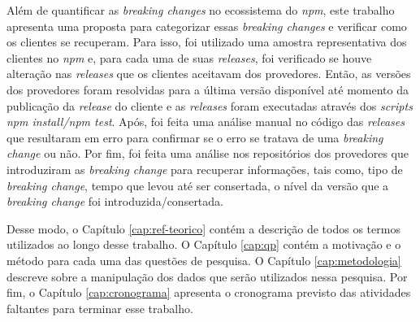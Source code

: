 Além de quantificar as \textit{breaking changes} no ecossistema do \textit{npm}, este trabalho apresenta uma proposta para categorizar essas \textit{breaking changes} e verificar como os clientes se recuperam. Para isso, foi utilizado uma amostra representativa dos clientes no \textit{npm} e, para cada uma de suas \textit{releases}, foi verificado se houve alteração nas \textit{releases} que os clientes aceitavam dos provedores. Então, as versões dos provedores foram resolvidas para a última versão disponível até momento da publicação da \textit{release} do cliente e as \textit{releases} foram executadas através dos \textit{scripts npm install/npm test}. Após, foi feita uma análise manual no código das \textit{releases} que resultaram em erro para confirmar se o erro se tratava de uma \textit{breaking change} ou não. Por fim, foi feita uma análise nos repositórios dos provedores que introduziram as \textit{breaking change} para recuperar informações, tais como, tipo de \textit{breaking change}, tempo que levou até ser consertada, o nível da versão que a \textit{breaking change} foi introduzida/consertada.

Desse modo, o Capítulo \ref{cap:ref-teorico} contém a descrição de todos os termos utilizados ao longo desse trabalho. O Capítulo \ref{cap:qp} contém a motivação e o método para cada uma das questões de pesquisa. O Capítulo \ref{cap:metodologia} descreve sobre a manipulação dos dados que serão utilizados nessa pesquisa. Por fim, o Capítulo \ref{cap:cronograma} apresenta o cronograma previsto das atividades faltantes para terminar esse trabalho.


